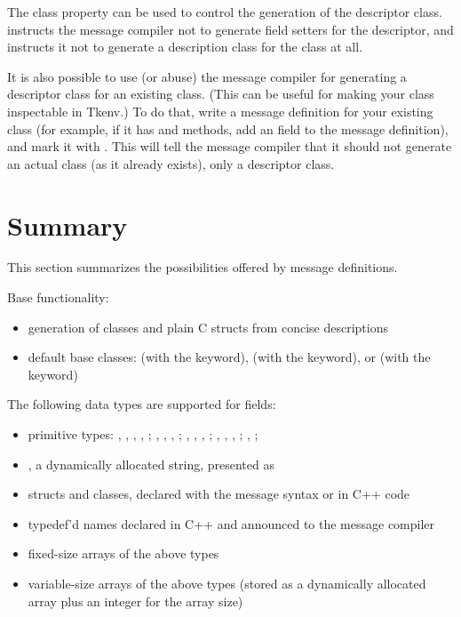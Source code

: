The  class property can be used to control the generation
of the descriptor class.  instructs the message
compiler not to generate field setters for the descriptor, and
 instructs it not to generate a description class
for the class at all.

It is also possible to use (or abuse) the message compiler for generating a
descriptor class for an existing class. (This can be useful for making your
class inspectable in Tkenv.) To do that, write a message definition for
your existing class (for example, if it has  and
 methods, add an  field to the message
definition), and mark it with . This will tell the
message compiler that it should not generate an actual class (as it already
exists), only a descriptor class.



\section{Summary}
\label{sec:msg-defs:summary}

This section summarizes the possibilities offered by message definitions.

Base functionality:

\begin{itemize}
  \item generation of classes and plain C structs from concise descriptions
  \item default base classes:
     (with the  keyword),
     (with the  keyword), or
     (with the  keyword)
\end{itemize}

The following data types are supported for fields:

\begin{itemize}
  \item primitive types:
    , , , , ;
    , , , ;
    , , , ;
    , , , ;
    , ; 
  \item {}, a dynamically allocated string, presented as 
  \item structs and classes, declared with the message syntax or in C++ code
  \item typedef'd names declared in C++ and announced to the message compiler
  \item fixed-size arrays of the above types
  \item variable-size arrays of the above types (stored as a dynamically
    allocated array plus an integer for the array size)
\end{itemize}

